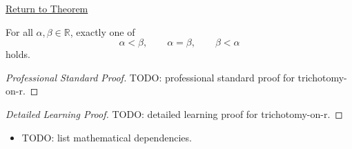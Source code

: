 \newpage
{}
\label{prf:trichotomy-on-r}

\begin{remark*}[Return]
\hyperref[thm:trichotomy-on-r]{Return to Theorem}
\end{remark*}

\begin{theorem*}[Trichotomy on $R$]
For all $\alpha,\beta\in\mathbb{R}$, exactly one of
\[
\alpha<\beta,\qquad \alpha=\beta,\qquad \beta<\alpha
\]
holds.
\end{theorem*}

\begin{proof}[Professional Standard Proof]
\LRAProofBodyStart
TODO: professional standard proof for trichotomy-on-r.
\end{proof}

\begin{proof}[Detailed Learning Proof]
\LRAProofBodyStart
TODO: detailed learning proof for trichotomy-on-r.
\end{proof}

\begin{remark*}
\end{remark*}

\begin{dependencies}
\begin{itemize}
  \item TODO: list mathematical dependencies.
\end{itemize}
\end{dependencies}

\clearpage
